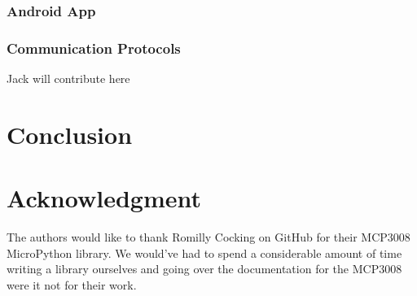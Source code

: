 \documentclass[11pt,journal]{IEEEtran}
\begin{document}
\subsubsection{Android App}
\subsubsection{Communication Protocols}
Jack will contribute here



% 


\section{Conclusion}



\section*{Acknowledgment}

The authors would like to thank Romilly Cocking on GitHub for their MCP3008 MicroPython library. We would've had to spend a considerable amount of time writing a library ourselves and going over the documentation for the MCP3008 were it not for their work.\cite{cocking_pico_code_2023}




\end{document}
